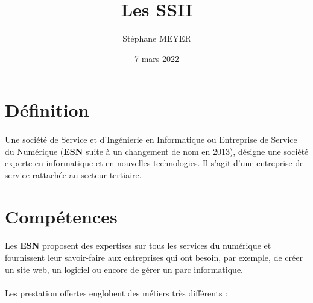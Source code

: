 \documentclass{article}
\title{Les \textbf{SSII}}
\date{7 mars 2022}
\author{Stéphane MEYER}
\begin{document}
  \maketitle
  \newpage

\section{Définition}

\paragraph{}

Une société de Service et d'Ingénierie en Informatique ou Entreprise de Service du Numérique (\textbf{ESN} suite à un changement de nom en 2013), désigne une société experte en informatique et en nouvelles technologies. Il s'agit d'une entreprise de service rattachée au secteur tertiaire.

\section{Compétences}

\paragraph{}

Les \textbf{ESN} proposent des expertises sur tous les services du numérique et fournissent leur savoir-faire aux entreprises qui ont besoin, par exemple, de créer un site web, un logiciel ou encore de gérer un parc informatique.

\paragraph{}

Les prestation offertes englobent des métiers très différents :
\end{document}
